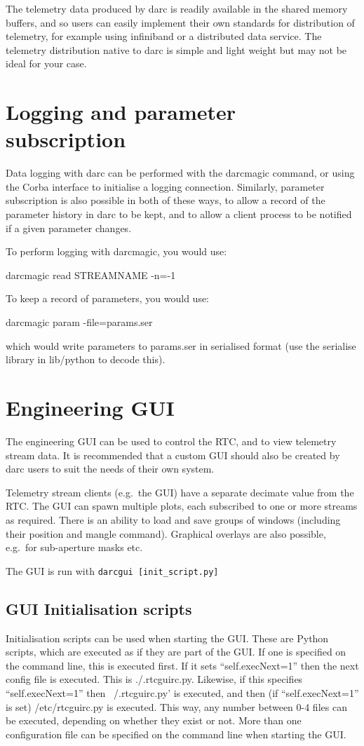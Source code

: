 \documentclass[a4,10pt]{article}
\begin{document}
The telemetry data produced by darc is readily available in the shared
memory buffers, and so users can easily implement their own standards
for distribution of telemetry, for example using infiniband or a
distributed data service.  The telemetry distribution native to darc
is simple and light weight but may not be ideal for your case.  

\section{Logging and parameter subscription}
Data logging with darc can be performed with the darcmagic command, or
using the Corba interface to initialise a logging connection.
Similarly, parameter subscription is also possible in both of these
ways, to allow a record of the parameter history in darc to be kept,
and to allow a client process to be notified if a given parameter changes.

To perform logging with darcmagic, you would use:

darcmagic read STREAMNAME -n=-1

To keep a record of parameters, you would use:

darcmagic param -file=params.ser

which would write parameters to params.ser in serialised format (use
the serialise library in lib/python to decode this).


\section{Engineering GUI}
The engineering GUI can be used to control the RTC, and to view
telemetry stream data.  It is recommended that a custom GUI should
also be created by darc users to suit the needs of their own system.

Telemetry stream clients (e.g.\ the GUI) have a separate decimate
value from the RTC.  The GUI can
spawn multiple plots, each subscribed to one or more streams as
required.  There is an ability to load and save groups of windows
(including their position and mangle command).  Graphical overlays are
also possible, e.g.\ for sub-aperture masks etc.

The GUI is run with {\tt darcgui [init\_script.py]}

\subsection{GUI Initialisation scripts}
Initialisation scripts can be used when starting the GUI.  These are
Python scripts, which are executed as if they are part of the GUI.  If
one is specified on the command line, this is executed first.  If it
sets ``self.execNext=1'' then the next config file is executed.  This
is ./.rtcguirc.py.  Likewise, if this specifies ``self.execNext=1''
then ~/.rtcguirc.py' is executed, and then (if ``self.execNext=1'' is
set) /etc/rtcguirc.py is executed.  This way, any number between 0-4
files can be executed, depending on whether they exist or not.  More
than one configuration file can be specified on the command line when
starting the GUI.
\end{document}
